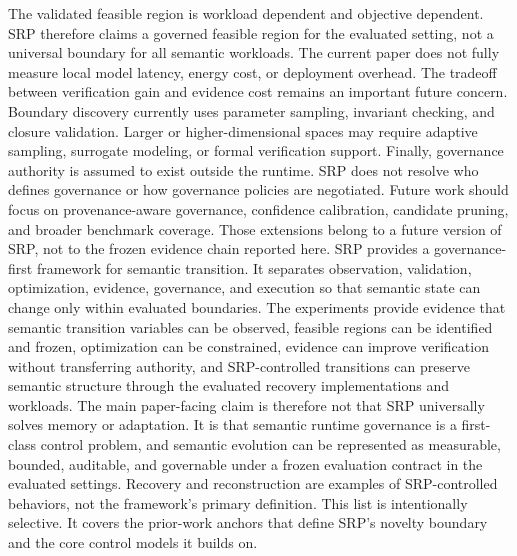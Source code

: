 {}The validated feasible region is workload dependent and objective dependent. SRP therefore claims a governed feasible region for the evaluated setting, not a universal boundary for all semantic workloads.\markdownRendererParagraphSeparator
{}The current paper does not fully measure local model latency, energy cost, or deployment overhead. The tradeoff between verification gain and evidence cost remains an important future concern.\markdownRendererParagraphSeparator
{}Boundary discovery currently uses parameter sampling, invariant checking, and closure validation. Larger or higher-dimensional spaces may require adaptive sampling, surrogate modeling, or formal verification support.\markdownRendererParagraphSeparator
{}Finally, governance authority is assumed to exist outside the runtime. SRP does not resolve who defines governance or how governance policies are negotiated.\markdownRendererParagraphSeparator
{}Future work should focus on provenance-aware governance, confidence calibration, candidate pruning, and broader benchmark coverage. Those extensions belong to a future version of SRP, not to the frozen evidence chain reported here.\markdownRendererInterblockSeparator
{}
\markdownRendererSectionEnd \markdownRendererSectionBegin
{}\markdownRendererInterblockSeparator
{}SRP provides a governance-first framework for semantic transition. It separates observation, validation, optimization, evidence, governance, and execution so that semantic state can change only within evaluated boundaries. The experiments provide evidence that semantic transition variables can be observed, feasible regions can be identified and frozen, optimization can be constrained, evidence can improve verification without transferring authority, and SRP-controlled transitions can preserve semantic structure through the evaluated recovery implementations and workloads.\markdownRendererParagraphSeparator
{}The main paper-facing claim is therefore not that SRP universally solves memory or adaptation. It is that semantic runtime governance is a first-class control problem, and semantic evolution can be represented as measurable, bounded, auditable, and governable under a frozen evaluation contract in the evaluated settings. Recovery and reconstruction are examples of SRP-controlled behaviors, not the framework's primary definition.\markdownRendererInterblockSeparator
{}
\markdownRendererSectionEnd \markdownRendererSectionBegin
{}\markdownRendererInterblockSeparator
{}This list is intentionally selective. It covers the prior-work anchors that define SRP's novelty boundary and the core control models it builds on.\markdownRendererInterblockSeparator

